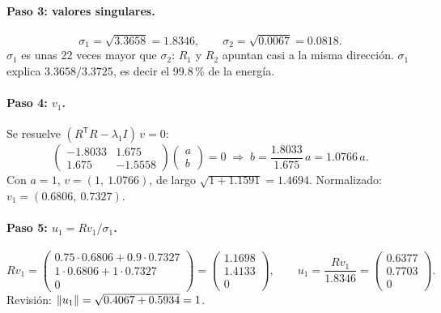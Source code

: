 \documentclass[11pt,letterpaper]{article}
\newcommand{\T}{^{\mathsf{T}}}
\newcommand{\raiz}[1]{\sqrt{#1}}
\begin{document}
\paragraph{Paso 3: valores singulares.}
\[
    \sigma_1 = \raiz{3.3658} = 1.8346,
    \qquad
    \sigma_2 = \raiz{0.0067} = 0.0818 .
\]
$\sigma_1$ es unas 22 veces mayor que $\sigma_2$: $R_1$ y $R_2$
apuntan casi a la misma dirección. $\sigma_1$ explica
$3.3658 / 3.3725$, es decir el 99.8\,\% de la energía.

\paragraph{Paso 4: $v_1$.} Se resuelve
$(R\T R - \lambda_1 I)\, v = 0$:
\[
    \begin{pmatrix} -1.8033 & 1.675 \\ 1.675 & -1.5558 \end{pmatrix}
    \begin{pmatrix} a \\ b \end{pmatrix} = 0
    \;\Rightarrow\;
    b = \frac{1.8033}{1.675}\, a = 1.0766\, a .
\]
Con $a = 1$, $v = (1,\ 1.0766)$, de largo
$\raiz{1 + 1.1591} = 1.4694$. Normalizado:
$v_1 = (0.6806,\ 0.7327)$.

\paragraph{Paso 5: $u_1 = R v_1 / \sigma_1$.}
\[
    R v_1 =
    \begin{pmatrix}
        0.75 \cdot 0.6806 + 0.9 \cdot 0.7327 \\
        1 \cdot 0.6806 + 1 \cdot 0.7327 \\
        0
    \end{pmatrix}
    = \begin{pmatrix} 1.1698 \\ 1.4133 \\ 0 \end{pmatrix},
    \qquad
    u_1 = \frac{R v_1}{1.8346}
        = \begin{pmatrix} 0.6377 \\ 0.7703 \\ 0 \end{pmatrix} .
\]
Revisión: $\norm{u_1} = \raiz{0.4067 + 0.5934} = 1$.
\end{document}
